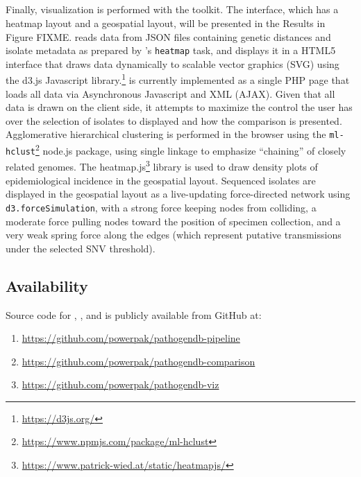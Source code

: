 \subsection{\pathogendbviz}

Finally, visualization is performed with the \pathogendbviz{} toolkit. The interface, which has a heatmap layout and a geospatial layout, will be presented in the Results in Figure FIXME. \pathogendbviz{} reads data from JSON files containing genetic distances and isolate metadata as prepared by \pathogendbcomparison{}'s \verb|heatmap| task, and displays it in a HTML5 interface that draws data dynamically to scalable vector graphics (SVG) using the d3.js Javascript library.\footnote{\url{https://d3js.org/}} \pathogendbviz{} is currently implemented as a single PHP page that loads all data via Asynchronous Javascript and XML (AJAX).\autocite{Paulson2005} Given that all data is drawn on the client side, it attempts to maximize the control the user has over the selection of isolates to displayed and how the comparison is presented. Agglomerative hierarchical clustering is performed in the browser using the \texttt{ml-hclust}\footnote{\url{https://www.npmjs.com/package/ml-hclust}} node.js package, using single linkage to emphasize ``chaining'' of closely related genomes. The heatmap.js\footnote{\url{https://www.patrick-wied.at/static/heatmapjs/}} library is used to draw density plots of epidemiological incidence in the geospatial layout. Sequenced isolates are displayed in the geospatial layout as a live-updating force-directed network using \texttt{d3.forceSimulation}, with a strong force keeping nodes from colliding, a moderate force pulling nodes toward the position of specimen collection, and a very weak spring force along the edges (which represent putative transmissions under the selected SNV threshold).

\subsection{Availability}

Source code for \pathogendbpipeline, \pathogendbcomparison, and \pathogendbviz{} is publicly available from GitHub at:

\begin{enumerate}[label=\arabic*.,noitemsep,labelindent=2em,leftmargin=!]
\item \url{https://github.com/powerpak/pathogendb-pipeline}
\item \url{https://github.com/powerpak/pathogendb-comparison}
\item \url{https://github.com/powerpak/pathogendb-viz}
\end{enumerate}

